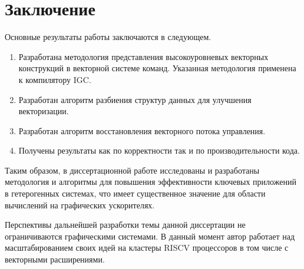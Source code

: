 \chapter*{Заключение}                       %


Основные результаты работы заключаются в следующем.

\begin{enumerate}[beginpenalty=10000] %
  \item Разработана методология представления высокоуровневых векторных конструкций в векторной системе команд. Указанная методология применена к компилятору IGC.
  \item Разработан алгоритм разбиения структур данных для улучшения векторизации.
  \item Разработан алгоритм восстановления векторного потока управления.
  \item Получены результаты как по корректности так и по производительности кода.
\end{enumerate}

Таким образом, в диссертационной работе исследованы и разработаны методология и алгоритмы для повышения эффективности ключевых приложений в гетерогенных системах, что имеет существенное значение для области вычислений на графических ускорителях.

Перспективы дальнейшей разработки темы данной диссертации не ограничиваются графическими системами. В данный момент автор работает над масштабированием своих идей на кластеры RISCV процессоров в том числе с векторными расширениями.